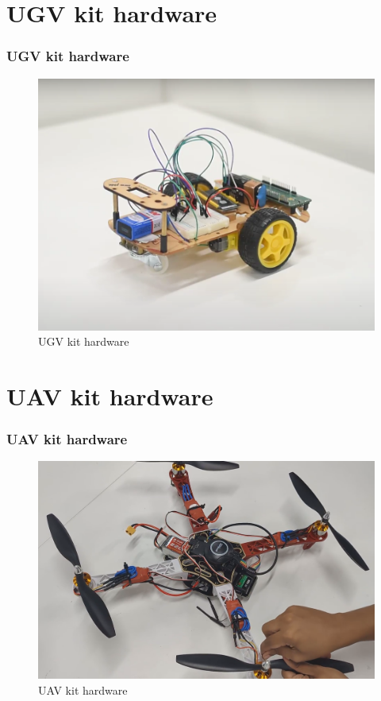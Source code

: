 \documentclass{beamer}
\begin{document}
\section{UGV kit hardware}
\begin{frame}
\frametitle{UGV kit hardware}
\begin{figure}[h!]
  \centering
  \includegraphics[width=0.8\linewidth]{./figs/UGV_components_1.png}
  \caption{UGV kit hardware}
  \label{UGV_kit_hardware}
\end{figure}
\end{frame}

\section{UAV kit hardware}
\begin{frame}
\frametitle{UAV kit hardware}
\begin{figure}[h!]
  \centering
  \includegraphics[width=0.9\linewidth]{./figs/UAV_components.png}
  \caption{UAV kit hardware}
  \label{fig:side3}
\end{figure}
\end{frame}
\end{document}

